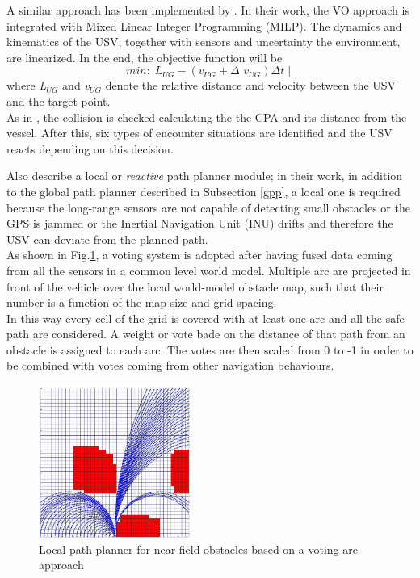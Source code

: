 \documentclass[12pt]{article}
\begin{document}
              \indent A similar approach has been implemented by \textcite{Leng2013}. In their work, the VO approach is integrated with Mixed Linear Integer Programming (MILP). The dynamics and kinematics of the USV, together with sensors and uncertainty the environment, are linearized. In the end, the objective function will be
                  \begin{equation} \label{eq:milp}
                    min:  \mid  \textit{L$_{UG}$} - (\textit{v$_{UG}$} + \textit{$\Delta$ v$_{UG}$}) \Delta t \mid
                  \end{equation}
              where \textit{L$_{UG}$} and \textit{v$_{UG}$} denote the relative distance and velocity between the USV and the target point.\\
              As in \parencite{Kuwata2014}, the collision is checked calculating the the CPA and its distance from the vessel. After this, six types of encounter situations are identified and the USV reacts depending on this decision.

              \indent Also \textcite{Larson2007,Larson2007a} describe a local or \textit{reactive} path planner module; in their work, in addition to the global path planner described in Subsection \ref{gpp}, a local one is required because the long-range sensors are not capable of detecting small obstacles or the GPS is jammed or the Inertial Navigation Unit (INU) drifts and therefore the USV can deviate from the planned path. \\
              As shown in Fig.\ref{fig:arcs}, a voting system is adopted after having fused data coming from all the sensors in a common level world model. Multiple arc are projected in front of the vehicle over the local world-model obstacle map, such that their number is a function of the map size and grid spacing. \\
              In this way every cell of the grid is covered with at least one arc and all the safe path are considered. A weight or vote bade on the distance of that path from an obstacle is assigned to each arc. The votes are then scaled from 0 to -1 in order to be combined with votes coming from other navigation behaviours.

              \begin{figure}
                    \centering
                    \includegraphics[height=5cm]{./Images/Larson/arcs}
                    \caption{Local path planner for near-field obstacles based on a voting-arc approach}
                    \label{fig:arcs}
              \end{figure}
\end{document}
